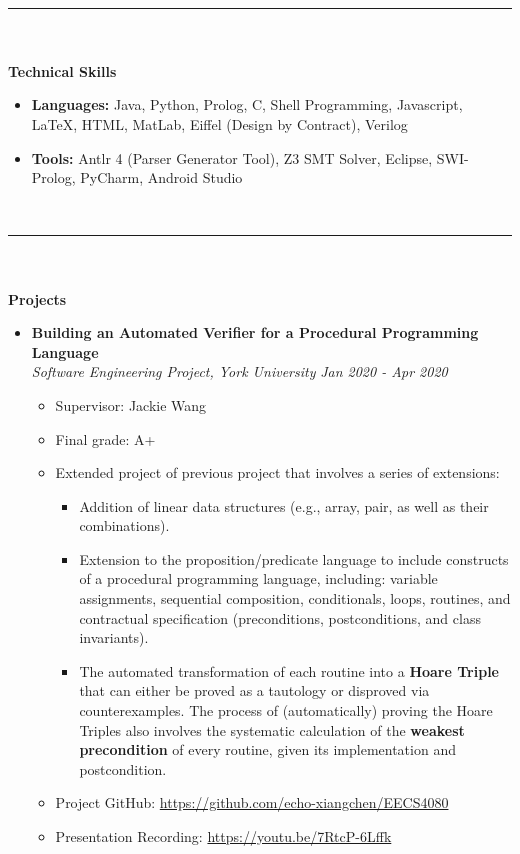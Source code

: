 \documentclass[a4paper,10pt,titlepage]{article}
\begin{document}
~\\
\rule{\linewidth}{0.1mm}
~\\
\\
\textbf {\Large Technical Skills} 
\begin{itemize}%
	\item {\bf Languages:} Java, Python, Prolog, C, Shell Programming, Javascript, \LaTeX, HTML, MatLab, Eiffel (Design by Contract),  Verilog
	\item {\bf Tools:} Antlr 4 (Parser Generator Tool), Z3 SMT Solver, Eclipse, SWI-Prolog, PyCharm, Android Studio
\end{itemize}
~\\
\rule{\linewidth}{0.1mm}
~\\
\\
\textbf {\Large Projects}
\begin{itemize}%
	\item {\bf Building an Automated Verifier for a Procedural Programming Language}
	\\\emph {Software Engineering Project, York University} {\hfill \emph{Jan 2020 - Apr 2020}}
	\begin{itemize}%
		\item Supervisor: Jackie Wang
		\item Final grade: A+
		\item Extended project of previous project that involves a series of extensions:
			\begin{itemize}
				\item Addition of linear data structures (e.g., array, pair, as well as their combinations).
				\item Extension to the proposition/predicate language to include constructs of a procedural programming language, including: variable assignments, sequential composition, conditionals, loops, routines, and contractual specification (preconditions, postconditions, and class invariants).
				\item The automated transformation of each routine into a {\bf Hoare Triple} that can either be proved as a tautology or disproved via counterexamples. The process of (automatically) proving the Hoare Triples also involves the systematic calculation of the {\bf weakest precondition} of every routine, given its implementation and postcondition.
			\end{itemize}
		\item Project GitHub: \url{https://github.com/echo-xiangchen/EECS4080}
		\item Presentation Recording: \url{https://youtu.be/7RtcP-6Lffk}
	\end{itemize}
\end{itemize}
\end{document}
